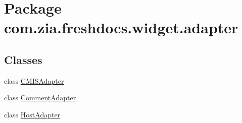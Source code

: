 \hypertarget{namespacecom_1_1zia_1_1freshdocs_1_1widget_1_1adapter}{\section{Package com.\-zia.\-freshdocs.\-widget.\-adapter}
\label{namespacecom_1_1zia_1_1freshdocs_1_1widget_1_1adapter}
}
\subsection*{Classes}
\begin{DoxyCompactItemize}
\item 
class \hyperlink{classcom_1_1zia_1_1freshdocs_1_1widget_1_1adapter_1_1_c_m_i_s_adapter}{C\-M\-I\-S\-Adapter}
\item 
class \hyperlink{classcom_1_1zia_1_1freshdocs_1_1widget_1_1adapter_1_1_comment_adapter}{Comment\-Adapter}
\item 
class \hyperlink{classcom_1_1zia_1_1freshdocs_1_1widget_1_1adapter_1_1_host_adapter}{Host\-Adapter}
\end{DoxyCompactItemize}
